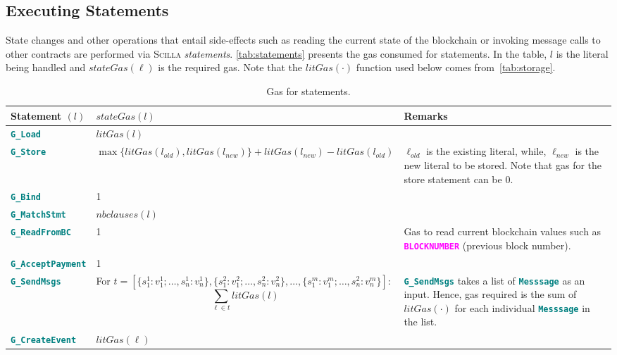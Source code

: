 \documentclass[10pt]{article}
\begin{document}
\subsection{Executing Statements}

State changes and other operations that entail side-effects such as reading the
current state of the blockchain or invoking message calls to other contracts
are performed via \textsc{Scilla} \emph{statements}. \autoref{tab:statements}
presents the gas consumed for statements. In the table, $l$ is the literal
being handled and $stateGas(\ell)$ is the required gas. Note that the
$litGas(\cdot)$ function used below comes from~\autoref{tab:storage}.

\begin{table}[!hbt]
	\caption{Gas for statements. \label{tab:statements} }
\centering
	\begin{tabular}{|l|p{8cm}|p{4cm}|}
	\hline
		\textbf{Statement $(l)$} & \textbf{$stateGas(l)$} & \textbf{Remarks} \\ \hline
		\textbf{\texttt{\textcolor{teal}{G\_Load}}}  & $litGas(l)$  & \\ \hline
		\textbf{\texttt{\textcolor{teal}{G\_Store}}}  & $\max\{litGas(l_{old}),
		litGas(l_{new})\} + litGas(l_{new}) -
		litGas(l_{old})$  & $\ell_{old}$ is the existing literal, while, $\ell_{new}$ is the
		new literal to be stored. Note that gas for the store statement can be 0.  \\ \hline
		\textbf{\texttt{\textcolor{teal}{G\_Bind}}}  & 1 & \\ \hline
		\textbf{\texttt{\textcolor{teal}{G\_MatchStmt}}}  & $nbclauses(l)$  & \\ \hline
		\textbf{\texttt{\textcolor{teal}{G\_ReadFromBC}}}  & 1  & Gas to read
		current blockchain values such as
		\textbf{\textcolor{magenta}{\texttt{BLOCKNUMBER}}} (previous block
		number).  \\ \hline
		\textbf{\texttt{\textcolor{teal}{G\_AcceptPayment}}}  & 1  & \\ \hline
		\textbf{\texttt{\textcolor{teal}{G\_SendMsgs}}}  & For $t = [\{s_{1}^{1} :
		v_{1}^{1}; \ldots, s_n^1 : v_n^1\}, \{s_1^2 : v_1^2; \ldots, s_n^2 :
		v_n^2\}, \ldots, \{s_1^m : v_1^m; \ldots, s_n^2 : v_n^m\}] $: $$
		\sum_{\ell \in t} litGas(l) $$ &
		\textbf{\texttt{\textcolor{teal}{G\_SendMsgs}}} takes a list of
		\textbf{\texttt{\textcolor{teal}{Messsage}}} as an input. Hence, gas
		required  is the sum of $litGas(\cdot)$ for each individual
		\textbf{\texttt{\textcolor{teal}{Messsage}}} in the list. \\ \hline
		\textbf{\texttt{\textcolor{teal}{G\_CreateEvent}}}  & $litGas(\ell)$ & \\ \hline
	\end{tabular}
\end{table}
\end{document}
